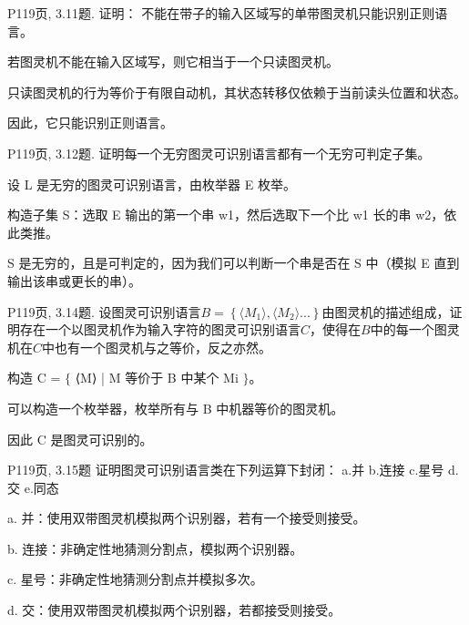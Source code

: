 \documentclass[11pt,addpoints,answers]{exam}
\begin{document}
\begin{questions}
		
		\question P119页, 3.11题.
		证明： 不能在带子的输入区域写的单带图灵机只能识别正则语言。
		\begin{solution}
			
            若图灵机不能在输入区域写，则它相当于一个只读图灵机。            
            
            只读图灵机的行为等价于有限自动机，其状态转移仅依赖于当前读头位置和状态。
            
            因此，它只能识别正则语言。
			
		\end{solution}  
		
		
		\question P119页, 3.12题.
		证明每一个无穷图灵可识别语言都有一个无穷可判定子集。
		\begin{solution}
			
            设 L 是无穷的图灵可识别语言，由枚举器 E 枚举。
            
            构造子集 S：选取 E 输出的第一个串 w1，然后选取下一个比 w1 长的串 w2，依此类推。
            
            S 是无穷的，且是可判定的，因为我们可以判断一个串是否在 S 中（模拟 E 直到输出该串或更长的串）。
			
		\end{solution}  
		
		\question P119页, 3.14题.
		设图灵可识别语言$B=\left\{\langle M_{1}\rangle ,\langle M_{2}\rangle ... \right\}$由图灵机的描述组成，证明存在一个以图灵机作为输入字符的图灵可识别语言$C$，使得在$B$中的每一个图灵机在$C$中也有一个图灵机与之等价，反之亦然。
		\begin{solution}
			构造 C = $\{$ ⟨M⟩ | M 等价于 B 中某个 Mi $\}$。
            
            可以构造一个枚举器，枚举所有与 B 中机器等价的图灵机。
            
            因此 C 是图灵可识别的。
			
		\end{solution}  
		
		\question P119页, 3.15题
		证明图灵可识别语言类在下列运算下封闭：
		a.并 b.连接 c.星号 d.交 e.同态
		\begin{solution}
			a. 并：使用双带图灵机模拟两个识别器，若有一个接受则接受。  
            
            b. 连接：非确定性地猜测分割点，模拟两个识别器。  
            
            c. 星号：非确定性地猜测分割点并模拟多次。  
            
            d. 交：使用双带图灵机模拟两个识别器，若都接受则接受。  
            

\end{solution}
\end{questions}
\end{document}
